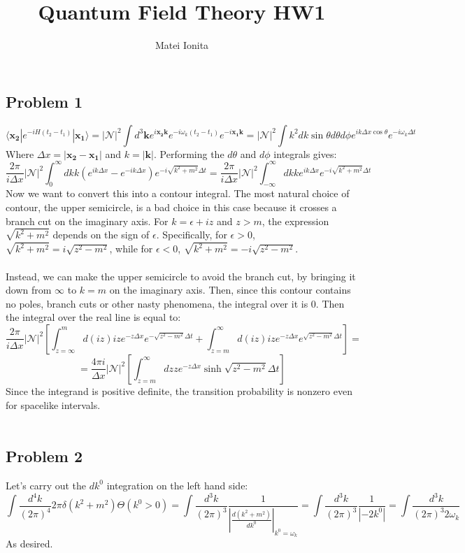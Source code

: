 \documentclass[12 pt]{article}
\title{Quantum Field Theory HW1}
\author{Matei Ionita}
\begin{document}
  \maketitle

\subsection*{Problem 1}
\[ \langle \mathbf{x_2}|e^{-iH(t_2-t_1)}|\mathbf{x_1}\rangle = |\mathcal{N} |^2 \int d^3 \mathbf{k} e^{i \mathbf{x_2 k}} e^{-i \omega_k (t_2-t_1)} e^{-i \mathbf{x_1 k}} = |\mathcal{N} |^2 \int k^2 dk \sin\theta d\theta d\phi e^{ik \Delta x \cos\theta} e^{-i \omega_k \Delta t} \]
Where $\Delta x = |\mathbf{x_2}-\mathbf{x_1}|$ and $k=|\mathbf{k}|$. Performing the $d\theta$ and $d\phi$ integrals gives:
\[ \frac{2\pi}{i\Delta x} |\mathcal{N} |^2 \int^{\infty}_{0} dk k (e^{ik\Delta x}-e^{-ik\Delta x}) e^{-i \sqrt{k^2+m^2} \Delta t} = \frac{2\pi}{i\Delta x} |\mathcal{N} |^2 \int^{\infty}_{-\infty} dk k e^{ik\Delta x} e^{-i \sqrt{k^2+m^2} \Delta t}\]
Now we want to convert this into a contour integral. The most natural choice of contour, the upper semicircle, is a bad choice in this case because it crosses a branch cut on the imaginary axis. For $k=\epsilon+iz$ and $z>m$, the expression $\sqrt{k^2+m^2}$ depends on the sign of $\epsilon$. Specifically, for $\epsilon>0$,  $\sqrt{k^2+m^2} = i \sqrt{z^2-m^2}$, while for $\epsilon<0$,  $\sqrt{k^2+m^2} = -i \sqrt{z^2-m^2}$.
\\
\\
Instead, we can make the upper semicircle to avoid the branch cut, by bringing it down from $\infty$ to $k=m$ on the imaginary axis. Then, since this contour contains no poles, branch cuts or other nasty phenomena, the integral over it is 0. Then the integral over the real line is equal to:
\[ \frac{2\pi}{i\Delta x} |\mathcal{N} |^2 \left[ \int^{m}_{z=\infty} d(iz) iz e^{-z\Delta x} e^{ -\sqrt{z^2-m^2} \Delta t}  + \int^{\infty}_{z=m} d(iz) iz e^{-z\Delta x} e^{ \sqrt{z^2-m^2} \Delta t} \right] = \]
\[ = \frac{4\pi i}{\Delta x} |\mathcal{N} |^2 \left[ \int^{\infty}_{z=m} dz z e^{-z\Delta x} \sinh{ \sqrt{z^2-m^2} \Delta t} \right] \]
Since the integrand is positive definite, the transition probability is nonzero even for spacelike intervals.
\\
\\

\subsection*{Problem 2}
Let's carry out the $dk^{0}$ integration on the left hand side:
\[ \int \frac{d^4 k}{(2\pi)^4} 2\pi \delta(k^2+m^2) \Theta (k^0>0) = \int \frac{d^3 k}{(2\pi)^3} \frac{1}{\left|\frac{d(k^2+m^2)}{d k^0} \right|_{k^0=\omega_k}} = \int \frac{d^3 k}{(2\pi)^3} \frac{1}{\left| -2k^0 \right|} = \int \frac{d^3 k}{(2\pi)^3 2\omega_k}\] 
As desired.
\\
\\
\end{document}
